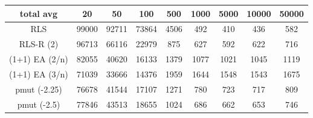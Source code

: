 \begin{tabular}[h]{ccccccccc}
total avg&20&50&100&500&1000&5000&10000&50000\\\hline
RLS&99000&92711&73864&4506&492&410&436&582\\
RLS-R (2)&96713&66116&22979&875&627&592&622&716\\
(1+1) EA (2/n)&82055&40620&16133&1379&1077&1021&1045&1119\\
(1+1) EA (3/n)&71039&33666&14376&1959&1644&1548&1543&1675\\
pmut (-2.25)&76678&41544&17107&1271&780&723&717&809\\
pmut (-2.5)&77846&43513&18655&1024&686&662&653&746\\
\end{tabular}

